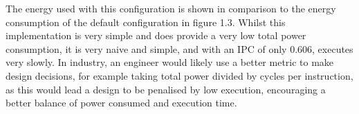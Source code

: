 \documentclass[paper=a4, fontsize=11pt]{scrartcl} %
\numberwithin{equation}{section} %
\numberwithin{figure}{section} %
\numberwithin{table}{section} %
\begin{document}
The energy used with this configuration is shown in comparison to the energy consumption of the default configuration in figure 1.3.  Whilst this implementation is very simple and does provide a very low total power consumption, it is very naive and simple, and with an IPC of only 0.606, executes very slowly.  In industry, an engineer would likely use a better metric to make design decisions, for example taking total power divided by cycles per instruction, as this would lead a design to be penalised by low execution, encouraging a better balance of power consumed and execution time.
\end{document}
